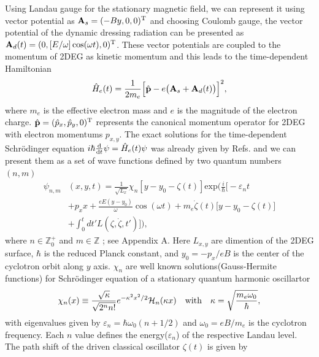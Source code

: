 Using Landau gauge for the stationary magnetic field, we can represent it using vector potential as $\vb{A}_{s} = (-By,0,0)^{\text{T}}$ and choosing Coulomb gauge, the vector potential of the dynamic dressing radiation can be presented as $\vb{A}_{d}(t) = (0,[E/\omega ]\cos(\omega t),0)^{\text{T}}$. These vector potentials are coupled to the momentum of 2DEG as kinetic momentum \cite{mahan81,bruus04} and this leads to the time-dependent Hamiltonian
\begin{equation} \label{eq_1}
  \hat{H}_e(t) = \frac{1}{2m_e}\Big[\hat{\vb{p}} - e\big(\vb{A}_{s}+\vb{A}_{d}(t)\big)\Big]^2,
\end{equation}
where $m_e$ is the effective electron mass and $e$ is the magnitude of the electron charge. $\hat{\vb{p}} = (\hat{p}_x,\hat{p}_y,0)^{\text{T}}$ represents the canonical momentum operator for 2DEG with electron momentums $p_{x,y}$.
The exact solutions for the time-dependent Schrödinger equation $i\hbar \dv{t}\psi = \hat{H}_e(t) \psi$ was already given by Refs. \cite{husmi53,ditt98,dini16} and we can present them as a set of wave functions defined by two quantum numbers $(n,m)$
\begin{equation} \label{eq_2}
  \begin{aligned}
    \psi_{n,m}&(x,y,t)  = \frac{1}{\sqrt{L_x}}
    \chi_n\left[y - y_0 - \zeta(t)\right]
    \text{exp}\bigg(
    \frac{i}{\hbar}\bigg[- \varepsilon_nt \\
    &
    + p_x x + \frac{eE(y - y_0)}{\omega}\cos(\omega t)+
    m_e\dot{\zeta}(t)\big[y - y_0 -\zeta(t)\big]\\
    & +
    \int_0^{t}dt'L(\zeta,\dot{\zeta},t')\bigg]\bigg),
  \end{aligned}
\end{equation}
where $n \in \mathbb{Z}^{+}_0$ and $m \in \mathbb{Z}$ ; see Appendix A. Here $L_{x,y}$ are dimention of the 2DEG surface, $\hbar$ is the reduced Planck constant, and $y_0 = -p_x/eB$ is the center of the cyclotron orbit along $y$ axis. $\chi_n$ are well known solutions(Gauss-Hermite functions) for Schrödinger equation of a stationary quantum harmonic oscillartor
\begin{equation} \label{eq_3}
  \chi_n(x) \equiv
   \frac{\sqrt{\kappa}}{\sqrt{2^{n}n!}}
  e^{-\kappa^2 x^2/2}
  \mathcal{H}_n \qty(\kappa x) \quad \text{with}
  \quad
  \kappa = \sqrt{\frac{m_e \omega_0}{\hbar}},
\end{equation}
with eigenvalues given by $\varepsilon_n = \hbar \omega_0 (n + 1/2)$ and $\omega_0 = eB/m_e$ is the cyclotron frequency. Each $n$ value defines the  energy($\varepsilon_n$) of the respective Landau level. The path shift of the driven classical oscillator $\zeta(t)$ is given by
